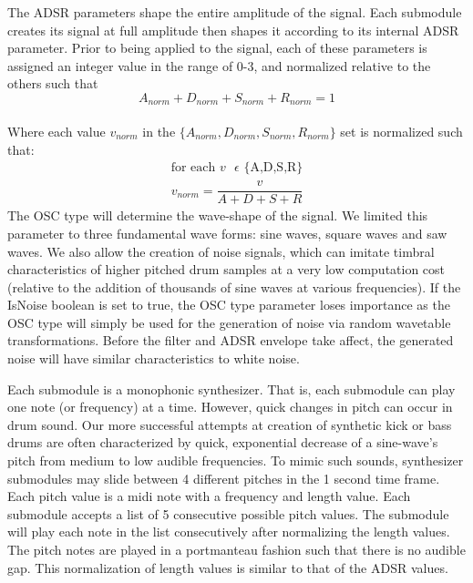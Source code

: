 \documentclass[\main/thesis.tex]{subfiles}
\begin{document}
The ADSR parameters shape the entire amplitude of the signal. Each submodule creates its signal at full amplitude then shapes it according to its internal ADSR parameter. Prior to being applied to the signal, each of these parameters is assigned an integer value in the range of 0-3, and normalized relative to the others such that \[ A_{norm} + D_{norm} + S_{norm} + R_{norm} = 1 \] \\ 
Where each value $v_{norm}$ in the $\{A_{norm}, D_{norm},S_{norm},R_{norm}\} $ set is normalized such that:
\begin{align*}
\text{for each $v$ $\epsilon$ \{A,D,S,R\}} \\
v_{norm} = \dfrac{v}{A + D + S + R}
\end{align*}
 The OSC type will determine the wave-shape of the signal. We limited this parameter to three fundamental wave forms: sine waves, square waves and saw waves. We also allow the creation of noise signals, which can imitate timbral characteristics of higher pitched drum samples at a very low computation cost (relative to the addition of thousands of sine waves at various frequencies). If the IsNoise boolean is set to true, the OSC type parameter loses importance as the OSC type will simply be used for the generation of noise via random wavetable transformations. Before the filter and ADSR envelope take affect, the generated noise will have similar characteristics to white noise. 

Each submodule is a monophonic synthesizer. That is, each submodule can play one note (or frequency) at a time. However, quick changes in pitch can occur in drum sound. Our more successful attempts at creation of synthetic kick or bass drums are often characterized by quick, exponential decrease of a sine-wave's pitch from medium to low audible frequencies. To mimic such sounds, synthesizer submodules may slide between 4 different pitches in the 1 second time frame. Each pitch value is a midi note with a frequency and length value. Each submodule accepts a list of 5 consecutive possible pitch values. The submodule will play each note in the list consecutively after normalizing the length values. The pitch notes are played in a portmanteau fashion such that there is no audible gap. This normalization of length values is similar to that of the ADSR values. 

\end{document}
